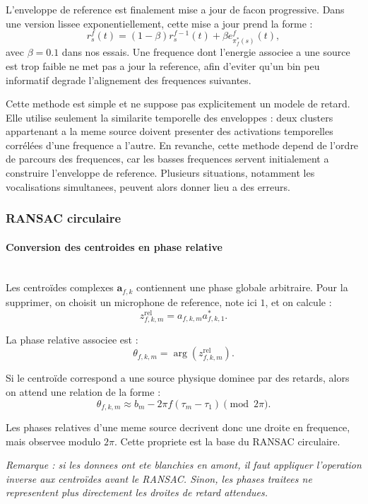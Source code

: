 \documentclass[11pt,a4paper]{article}
\begin{document}
L'enveloppe de reference est finalement mise a jour de facon progressive. Dans
une version lissee exponentiellement, cette mise a jour prend la forme :
\[
  r_s^{f}(t)
    =
    (1-\beta)r_s^{f-1}(t)
    +
    \beta e_{\pi_f^{*}(s)}^f(t),
\]
avec $\beta=0.1$ dans nos essais. Une frequence dont l'energie associee a une
source est trop faible ne met pas a jour la reference, afin d'eviter qu'un bin
peu informatif degrade l'alignement des frequences suivantes.

Cette methode est simple et ne suppose pas explicitement un modele de retard.
Elle utilise seulement la similarite temporelle des enveloppes : deux clusters
appartenant a la meme source doivent presenter des activations temporelles
corrélées d'une frequence a l'autre. En revanche, cette methode depend de
l'ordre de parcours des frequences, car les basses frequences servent
initialement a construire l'enveloppe de reference. Plusieurs situations,
notamment les vocalisations simultanees, peuvent alors donner lieu a des
erreurs.

\subsubsection{RANSAC circulaire} 
\paragraph{Conversion des centroides en phase relative} ~\\
Les centroïdes complexes $\mathbf{a}_{f,k}$ contiennent une phase globale
arbitraire. Pour la supprimer, on choisit un microphone de reference, note ici
$1$, et on calcule :
\[
  z^{\mathrm{rel}}_{f,k,m}
    =
    a_{f,k,m}
    a^{*}_{f,k,1}.
\]

La phase relative associee est :
\[
  \theta_{f,k,m}
    =
    \arg\left(z^{\mathrm{rel}}_{f,k,m}\right).
\]

Si le centroïde correspond a une source physique dominee par des retards, alors
on attend une relation de la forme :
\[
  \theta_{f,k,m}
    \approx
    b_m
    -
    2\pi f(\tau_m-\tau_1)
    \pmod{2\pi}.
\]

Les phases relatives d'une meme source decrivent donc une droite en frequence,
mais observee modulo $2\pi$. Cette propriete est la base du RANSAC circulaire.

\textit{Remarque : si les donnees ont ete blanchies en amont, il faut appliquer
l'operation inverse aux centroïdes avant le RANSAC. Sinon, les phases traitees ne
representent plus directement les droites de retard attendues.}
\end{document}
